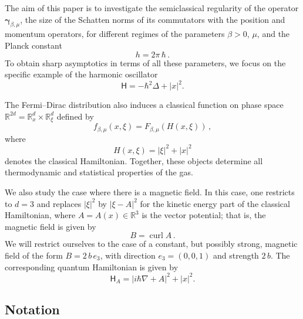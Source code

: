 \documentclass[11pt]{amsart}
\theoremstyle{plain}
\theoremstyle{definition}
\newcommand		{\RR}		{\mathbb R}			%
\newcommand		{\R}		{\RR}
\newcommand		{\Rd}		{\R^d}
\newcommand		{\Rdd}		{\R^{2d}}
\newcommand		\sfH		{\mathsf H}			%
\newcommand		{\lt}			{\left}				%
\newcommand		{\rt}			{\right}			%
\renewcommand	{\(}			{\lt(}
\renewcommand	{\)}			{\rt)}
\newcommand		{\n}[1]			{\lt\lvert #1 \rt\rvert}
\newcommand			{\grad}		{\nabla}
\DeclareMathOperator{\curl}		{curl}				%
\newcommand		{\opgam}	{{\boldsymbol{\gamma}}}	%
\begin{document}
    The aim of this paper is to investigate the semiclassical regularity of the operator $\opgam_{\beta,\mu}$, the size of the Schatten norms of its commutators with the position and momentum operators, for different regimes of the parameters $\beta>0$, $\mu$, and the Planck constant
    \begin{equation*}
        h = 2\pi\,\hbar \,.
    \end{equation*}
    To obtain sharp asymptotics in terms of all these parameters, we focus on the specific example of the harmonic oscillator
    \begin{equation*}
        \sfH = -\hbar^2\Delta + \n{x}^2.
    \end{equation*}
    
    The Fermi--Dirac distribution also induces a classical function on phase space $\Rdd = \Rd_x\times \Rd_\xi$ defined by
    \begin{equation*}
        f_{\beta, \mu}(x, \xi) = F_{\beta,\mu}(H(x, \xi)) \, ,
    \end{equation*}
    where
    \begin{equation*}
        H(x,\xi) = \n{\xi}^2 + \n{x}^2
    \end{equation*}
    denotes the classical Hamiltonian. Together, these objects determine all thermodynamic and statistical properties of the gas.
    
    We also study the case where there is a magnetic field. In this case, one restricts to $d=3$ and replaces $\n{\xi}^2$ by $\n{\xi-A}^2$ for the kinetic energy part of the classical Hamiltonian, where $A = A(x) \in \R^3$ is the vector potential; that is, the magnetic field is given by
    \begin{equation*}
        B = \curl A \, .
    \end{equation*}
	We will restrict ourselves to the case of a constant, but possibly strong, magnetic field of the form $B=2\,b\,e_3$, with direction $e_3=(0,0,1)$ and strength $2\,b$. The corresponding quantum Hamiltonian is given by
    \begin{equation*}
        \sfH_A =\n{i\hbar\grad+A}^2+\n{x}^2 .
    \end{equation*}

\subsection{Notation}
\end{document}
